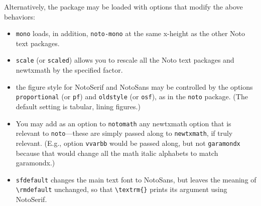 \documentclass[]{article}
\begin{document}
Alternatively, the package may be loaded with options that modify the above behaviors:
\begin{itemize}
\item {\tt mono} loads, in addition, {\tt noto-mono} at the same x-height as the other Noto text packages.
\item
{\tt scale} (or {\tt scaled}) allows you to rescale all the Noto text packages and newtxmath by the specified factor.
\item the figure style for NotoSerif and NotoSans may be controlled by the options {\tt proportional} (or {\tt pf}) and {\tt oldstyle} (or {\tt osf}), as in the {\tt noto} package. (The default setting is tabular, lining figures.)
\item You may add as an option to {\tt notomath} any  newtxmath option that is relevant to {\tt noto}---these are simply passed along to {\tt newtxmath}, if truly relevant. (E.g., option {\tt vvarbb} would be passed along, but not {\tt garamondx} because that would change all the math italic alphabets to match garamondx.)
\item {\tt sfdefault} changes the main text font to NotoSans, but leaves the meaning of \verb|\rmdefault| unchanged, so that \verb|\textrm{}| prints its argument using NotoSerif.

\end{itemize}
\end{document}
